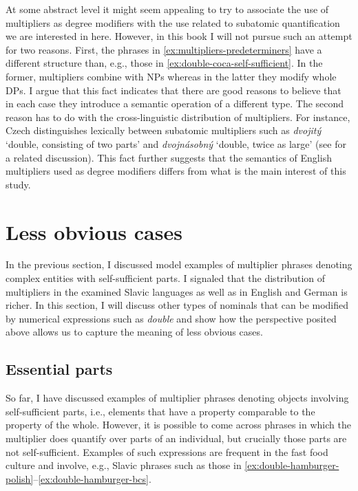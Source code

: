 At some abstract level it might seem appealing to try to associate the use of multipliers as degree modifiers with the use related to subatomic quantification we are interested in here. However, in this book I will not pursue such an attempt for two reasons. First, the phrases in \ref{ex:multipliers-predeterminers} have a different structure than, e.g., those in \ref{ex:double-coca-self-sufficient}. In the former, multipliers combine with NPs whereas in the latter they modify whole DPs. I argue that this fact indicates that there are good reasons to believe that in each case they introduce a semantic operation of a different type. The second reason has to do with the cross-linguistic distribution of multipliers. For instance, Czech distinguishes lexically between subatomic multipliers such as \textit{dvojitý} `double, consisting of two parts' and \textit{dvojnásobný} `double, twice as large' (see \citealt{docekal_wagiel2018event} for a related discussion). This  fact further suggests that the semantics of English multipliers used as degree modifiers differs from what is the main interest of this study.

\section{Less obvious cases}\label{sec:less-obvious-cases}

In the previous section, I discussed model examples of multiplier phrases denoting complex entities with self-sufficient parts. I signaled that the distribution of multipliers in the examined Slavic languages as well as in English and German is richer. In this section, I will discuss other types of nominals that can be modified by numerical expressions such as \textit{double} and show how the perspective posited above allows us to capture the meaning of less obvious cases.  

\subsection{Essential parts}\label{sec:essential-parts}

So far, I have discussed examples of multiplier phrases denoting objects involving self-sufficient parts, i.e., elements that have a property comparable to the property of the whole. However, it is possible to come across phrases in which the multiplier does quantify over parts of an individual, but crucially those parts are not self-sufficient. Examples of such expressions are frequent in the fast food culture and involve, e.g., Slavic phrases such as those in \ref{ex:double-hamburger-polish}--\ref{ex:double-hamburger-bcs}. 

